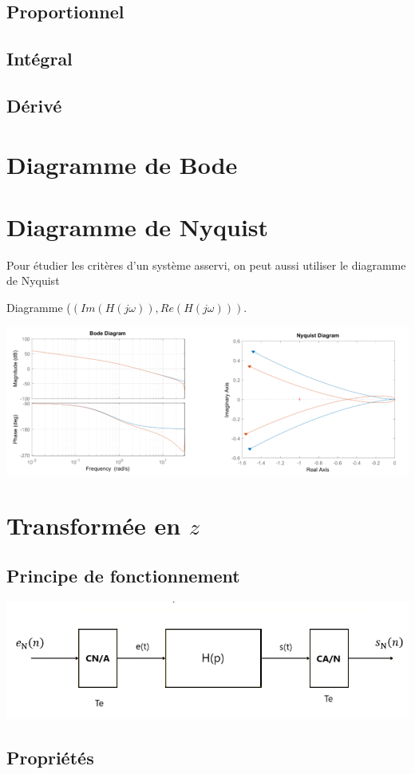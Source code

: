 \subsection{Proportionnel}
\subsection{Intégral}
\subsection{Dérivé}
\section{Diagramme de Bode}
\newpage
\section{Diagramme de Nyquist}
Pour étudier les critères d'un système asservi, on peut aussi utiliser le diagramme de Nyquist \newline 

Diagramme ($(Im(H(j\omega)),Re(H(j\omega)))$.  

\begin{center}
\includegraphics[scale=0.7]{Pics/Nyquist.png}    
\end{center}
\newpage
\section{Transformée en $z$}
\subsection{Principe de fonctionnement}
\begin{center}
    \includegraphics[scale=0.8]{Pics/TransformeeZ.png}
\end{center}
\subsection{Propriétés}
\begin{center}
    \Large{} \newline
    
    \Large{} \newline

    \Large{} \newline  
\end{center}
